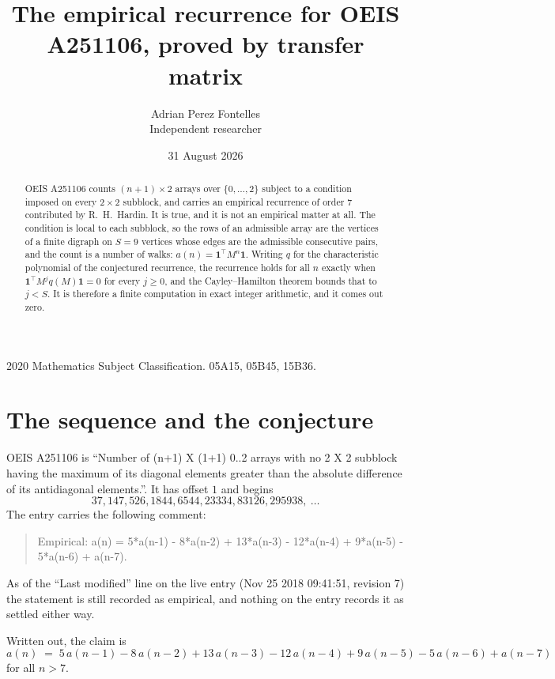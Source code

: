 \documentclass[11pt,a4paper]{article}
\title{The empirical recurrence for OEIS A251106, proved by transfer matrix}
\author{Adrian Perez Fontelles\\ \small Independent researcher}
\date{31 August 2026}
\theoremstyle{plain}
\theoremstyle{definition}
\begin{document}
\maketitle

\begin{abstract}
OEIS A251106 counts $(n+1)\times2$ arrays over $\{0,\dots,2\}$ subject to a condition imposed on
every $2\times2$ subblock, and carries an empirical recurrence of order $7$ contributed
by R.~H.~Hardin. It is true, and it is not an empirical matter at all. The condition is local
to each subblock, so the rows of an admissible array are the vertices of a finite digraph
on $S=9$ vertices whose edges are the admissible consecutive pairs, and the count is a
number of walks: $a(n)=\mathbf{1}^{\!\top}M^{n}\mathbf{1}$. Writing $q$
for the characteristic polynomial of the conjectured recurrence, the recurrence holds for all
$n$ exactly when $\mathbf{1}^{\!\top}M^{j}q(M)\mathbf{1}=0$ for every $j\ge0$, and the
Cayley--Hamilton theorem bounds that to $j<S$. It is therefore a finite computation in exact
integer arithmetic, and it comes out zero.
\end{abstract}

\noindent\small 2020 Mathematics Subject Classification. 05A15, 05B45, 15B36.\normalsize

\section{The sequence and the conjecture}

OEIS A251106 is ``Number of (n+1) X (1+1) 0..2 arrays with no 2 X 2 subblock having the maximum of its diagonal elements greater than the absolute difference of its antidiagonal elements.''. It has offset $1$ and begins
\[
37, 147, 526, 1844, 6544, 23334, 83126, 295938,\ \dots
\]
The entry carries the following comment:
\begin{quote}\small
Empirical: a(n) = 5*a(n-1) - 8*a(n-2) + 13*a(n-3) - 12*a(n-4) + 9*a(n-5) - 5*a(n-6) + a(n-7).
\end{quote}
As of the ``Last modified'' line on the live entry (Nov 25 2018 09:41:51, revision 7) the statement is
still recorded as empirical, and nothing on the entry records it as settled either way.

Written out, the claim is
\begin{equation}\label{eq:conj}
a(n)\;=\;5\,a(n-1) - 8\,a(n-2) + 13\,a(n-3) - 12\,a(n-4) + 9\,a(n-5) - 5\,a(n-6) + a(n-7)
\end{equation}
for all $n>7$.
\end{document}
